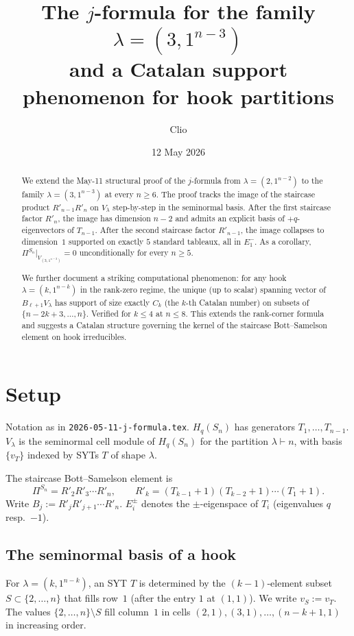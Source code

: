 \documentclass[11pt]{article}
\title{The $j$-formula for the family $\lambda=(3,1^{n-3})$\\
  and a Catalan support phenomenon for hook partitions}
\author{Clio}
\date{12 May 2026}
\theoremstyle{definition}
\begin{document}
\maketitle

\begin{abstract}
We extend the May-11 structural proof of the $j$-formula from
$\lambda=(2,1^{n-2})$ to the family $\lambda=(3,1^{n-3})$ at every
$n\ge 6$.  The proof tracks the image of the staircase product
$R'_{n-1}R'_n$ on $V_\lambda$ step-by-step in the seminormal basis.
After the first staircase factor $R'_n$, the image has dimension $n-2$
and admits an explicit basis of $+q$-eigenvectors of $T_{n-1}$.  After
the second staircase factor $R'_{n-1}$, the image collapses to
dimension~$1$ supported on exactly $5$ standard tableaux, all in
$E_1^-$.  As a corollary, $\Pi^{S_n}|_{V_{(3,1^{n-3})}}=0$
unconditionally for every $n\ge 5$.

We further document a striking computational phenomenon: for any hook
$\lambda=(k,1^{n-k})$ in the rank-zero regime, the unique
(up to scalar) spanning vector of $B_{\ell+1}V_\lambda$ has support of
size exactly $C_k$ (the $k$-th Catalan number) on subsets of
$\{n-2k+3,\ldots,n\}$.  Verified for $k\le 4$ at $n\le 8$.  This
extends the rank-corner formula and suggests a Catalan structure
governing the kernel of the staircase Bott--Samelson element on
hook irreducibles.
\end{abstract}

\section{Setup}

Notation as in \texttt{2026-05-11-j-formula.tex}.  $H_q(S_n)$ has
generators $T_1,\ldots,T_{n-1}$.  $V_\lambda$ is the seminormal cell
module of $H_q(S_n)$ for the partition $\lambda\vdash n$, with basis
$\{v_T\}$ indexed by SYTs $T$ of shape $\lambda$.

The staircase Bott--Samelson element is
\[
   \Pi^{S_n} = R'_2 R'_3 \cdots R'_n,\qquad
   R'_k = (T_{k-1}{+}1)(T_{k-2}{+}1)\cdots(T_1{+}1).
\]
Write $B_j := R'_j R'_{j+1}\cdots R'_n$.  $E_i^\pm$ denotes the
$\pm$-eigenspace of $T_i$ (eigenvalues $q$ resp.\ $-1$).

\subsection{The seminormal basis of a hook}

For $\lambda=(k,1^{n-k})$, an SYT $T$ is determined by the
$(k-1)$-element subset $S\subset\{2,\ldots,n\}$ that fills row~$1$
(after the entry $1$ at $(1,1)$).  We write $v_S := v_T$.  The values
$\{2,\ldots,n\}\setminus S$ fill column~$1$ in cells
$(2,1),(3,1),\ldots,(n-k+1,1)$ in increasing order.
\end{document}
